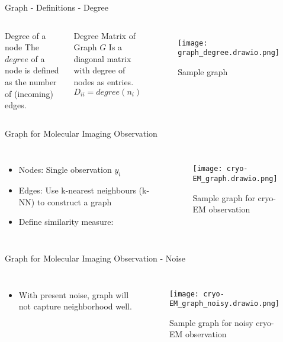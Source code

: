 \begin{frame}{Graph - Definitions - Degree}
  \begin{columns}
  
    \begin{block}{Degree of a node}
      The $degree$ of a node is defined as the number of (incoming) edges.
    \end{block}

    \begin{block}{Degree Matrix of Graph $G$}
      Is a diagonal matrix with degree of nodes as entries.
      $$D_{ii} = degree(n_i)$$
    \end{block}
  
    \pause

    \begin{figure}
      \centering
      \texttt{[image: graph\_degree.drawio.png]}
      \caption{Sample graph}        
    \end{figure}
  
  \end{columns}
  
  \end{frame}

\begin{frame}{Graph for Molecular Imaging Observation}
  \begin{columns}
    \begin{itemize}
      \item Nodes: Single observation $y_i$
      \item Edges: Use k-nearest neighbours (k-NN) to construct a graph
      \item Define similarity measure:
      
    \end{itemize}

    \pause
    \begin{figure}
      \centering
      \texttt{[image: cryo-EM\_graph.drawio.png]}
      \caption{Sample graph for cryo-EM observation}        
    \end{figure}
  \end{columns}
\end{frame}

\begin{frame}{Graph for Molecular Imaging Observation - Noise}
  \begin{columns}
    \begin{itemize}
      \item With present noise, graph will not capture neighborhood well.
    \end{itemize}

    \pause
    \begin{figure}
      \centering
      \texttt{[image: cryo-EM\_graph\_noisy.drawio.png]}
      \caption{Sample graph for noisy cryo-EM observation}        
    \end{figure}
  \end{columns}
\end{frame}


